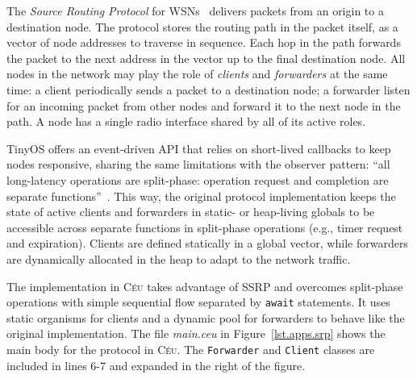 \documentclass[preprint]{sigplanconf}
\newcommand{\CEU}{\textsc{C\'{e}u}\xspace}
\newcommand{\code}[1] {{\small{\texttt{#1}}}}
\newcommand{\1}{\;}
\newcommand{\2}{\;\;}
\newcommand{\3}{\;\;\;}
\newcommand{\5}{\;\;\;\;\;}
\begin{document}
The \emph{Source Routing Protocol} for WSNs~\cite{wsn.teps} delivers packets 
from an origin to a destination node.
The protocol stores the routing path in the packet itself, as a vector of node 
addresses to traverse in sequence.
Each hop in the path forwards the packet to the next address in the vector up 
to the final destination node.
%
All nodes in the network may play the role of \emph{clients} and 
\emph{forwarders} at the same time:
%
a client periodically sends a packet to a destination node;
a forwarder listen for an incoming packet from other nodes and forward it to 
the next node in the path.
%
A node has a single radio interface shared by all of its active roles.

TinyOS offers an event-driven API that relies on short-lived callbacks to keep 
nodes responsive, sharing the same limitations with the observer pattern:
``all long-latency operations are split-phase: operation request and completion 
are separate functions''~\cite{wsn.nesc}.
%
This way, the original protocol implementation keeps the state of active 
clients and forwarders in static- or heap-living globals to be accessible 
across separate functions in split-phase operations (e.g., timer request and 
expiration).
%
Clients are defined statically in a global vector, while forwarders are 
dynamically allocated in the heap to adapt to the network traffic.

The implementation in \CEU takes advantage of SSRP and overcomes split-phase 
operations with simple sequential flow separated by \code{await} statements.
It uses static organisms for clients and a dynamic pool for forwarders to 
behave like the original implementation.
%
The file \emph{main.ceu} in Figure~\ref{lst.apps.srp} shows the main body for 
the protocol in \CEU.
The \code{Forwarder} and \code{Client} classes are included in lines 6-7 and 
expanded in the right of the figure.
\end{document}
